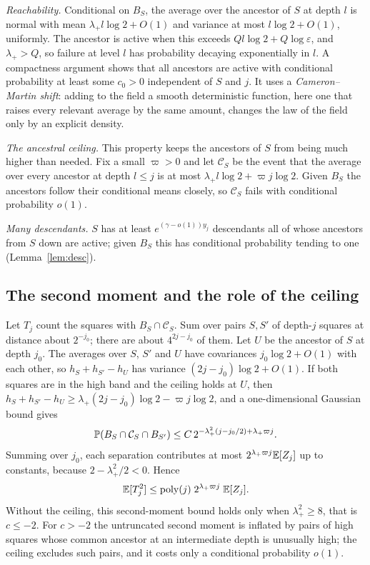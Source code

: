 \emph{Reachability.} Conditional on $B_S$, the average over the ancestor of $S$ at depth $l$ is
normal with mean $\lambda_+l\log2+O(1)$ and variance at most $l\log2+O(1)$, uniformly. The
ancestor is active when this exceeds $Ql\log2+Q\log\varepsilon$, and $\lambda_+>Q$, so failure at
level $l$ has probability decaying exponentially in $l$. A compactness argument shows that all ancestors are
active with conditional probability at least some $c_0>0$ independent of $S$ and $j$. It uses a
\emph{Cameron--Martin shift}: adding to the field a smooth deterministic function, here one that
raises every relevant average by the same amount, changes the law of the field only by an explicit
density.

\emph{The ancestral ceiling.} This property keeps the ancestors of $S$ from being much higher than
needed. Fix a small $\varpi>0$ and let $\mathcal C_S$ be the event that the average
over every ancestor at depth $l\le j$ is at most $\lambda_+l\log2+\varpi j\log2$. Given $B_S$ the
ancestors follow their conditional means closely, so $\mathcal C_S$ fails with conditional probability
$o(1)$.

\emph{Many descendants.} $S$ has at least $e^{(\gamma-o(1))y_j}$ descendants all of whose ancestors
from $S$ down are active; given $B_S$ this has conditional probability tending to one
(Lemma~\ref{lem:desc}).

\subsection{The second moment and the role of the ceiling}

Let $T_j$ count the squares with $B_S\cap \mathcal C_S$. Sum over pairs $S,S'$ of depth-$j$ squares at distance
about $2^{-j_0}$; there are about $4^{2j-j_0}$ of them. Let $U$ be the ancestor of $S$ at depth $j_0$.
The averages over $S$, $S'$ and $U$ have covariances $j_0\log2+O(1)$ with each other, so
$h_S+h_{S'}-h_U$ has variance $(2j-j_0)\log2+O(1)$. If both squares are in the high band and the
ceiling holds at $U$, then $h_S+h_{S'}-h_U\ge\lambda_+(2j-j_0)\log2-\varpi j\log2$, and a
one-dimensional Gaussian bound gives
\[
\mathbb{P}(B_S\cap \mathcal C_S\cap B_{S'})\le C\,2^{-\lambda_+^2(j-j_0/2)+\lambda_+\varpi j}.
\]
Summing over $j_0$, each separation contributes at most $2^{\lambda_+\varpi j}\mathbb{E}[Z_j]$ up to constants,
because $2-\lambda_+^2/2<0$. Hence
\[
\mathbb{E}[T_j^2]\le\mathrm{poly}(j)\;2^{\lambda_+\varpi j}\;\mathbb{E}[Z_j].
\]
Without the ceiling, this second-moment bound holds only when $\lambda_+^2\ge8$, that is $c\le-2$.
For $c>-2$ the untruncated second moment is inflated by pairs of high squares whose common
ancestor at an intermediate depth is unusually high; the ceiling excludes such pairs, and it costs
only a conditional probability $o(1)$.

